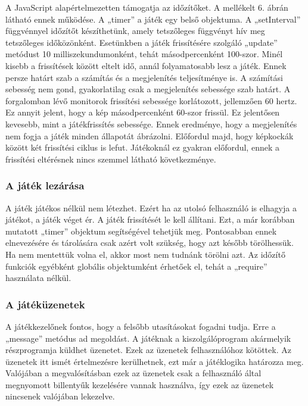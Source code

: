 \documentclass[bibliography=totocnumbered]{article}
\begin{document}
A JavaScript alapértelmezetten támogatja az időzítőket. A mellékelt 6.
ábrán látható ennek működése. A „timer'' a játék egy belső objektuma. A
„setInterval'' függvénnyel időzítőt készíthetünk, amely tetszőleges
függvényt hív meg tetszőleges időközönként. Esetünkben a játék
frissítésére szolgáló „update'' metódust 10 milliszekundumonként, tehát
másodpercenként 100-szor. Minél kisebb a frissítések között eltelt idő,
annál folyamatosabb lesz a játék. Ennek persze határt szab a számítás és
a megjelenítés teljesítménye is. A számítási sebesség nem gond,
gyakorlatilag csak a megjelenítés sebessége szab határt. A forgalomban
lévő monitorok frissítési sebessége korlátozott, jellemzően 60 hertz. Ez
annyit jelent, hogy a kép másodpercenként 60-szor frissül. Ez jelentősen
kevesebb, mint a játékfrissítés sebessége. Ennek eredménye, hogy a
megjelenítés nem fogja a játék minden állapotát ábrázolni. Előfordul
majd, hogy képkockák között két frissítési ciklus is lefut. Játékoknál
ez gyakran előfordul, ennek a frissítési eltérésnek nincs szemmel
látható következménye.


\subsubsection{A játék lezárása}

A játék játékos nélkül nem létezhet. Ezért ha az utolsó felhasználó is
elhagyja a játékot, a játék véget ér. A játék frissítését le kell
állítani. Ezt, a már korábban mutatott „timer'' objektum segítségével
tehetjük meg. Pontosabban ennek elnevezésére és tárolására csak azért
volt szükség, hogy azt később törölhessük. Ha nem mentettük volna el,
akkor most nem tudnánk törölni azt. Az időzítő funkciók egyébként
globális objektumként érhetőek el, tehát a „require'' használata nélkül.


\subsubsection{A játéküzenetek}

A játékkezelőnek fontos, hogy a felsőbb utasításokat fogadni tudja. Erre
a „message'' metódus ad megoldást. A játéknak a kiszolgálóprogram
akármelyik részprogramja küldhet üzenetet. Ezek az üzenetek
felhasználóhoz kötöttek. Az üzenetek itt ismét értelmezésre kerülhetnek,
ezt már a játéklogika határozza meg. Valójában a megvalósításban ezek az
üzenetek csak a felhasználó által megnyomott billentyűk kezelésére
vannak használva, így ezek az üzenetek nincsenek valójában lekezelve.
\end{document}
